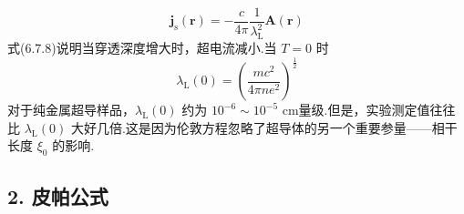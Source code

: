 \begin{equation}
  \boldsymbol{j}_{\mathrm{s}}(\boldsymbol{r})
  =-\frac{c}{4\pi}\frac{1}{\lambda_{\mathrm{L}}^{2}}\boldsymbol{A}(\boldsymbol{r})
\end{equation}
式(6.7.8)说明当穿透深度增大时，超电流减小.当 $T=0$ 时
\begin{equation}
  \lambda_{\mathrm{L}}(0)=\left(\frac{mc^{2}}{4\pi ne^{2}}\right)^{\frac{1}{2}}
\end{equation}
对于纯金属超导样品，$\lambda_{\mathrm{L}}(0)$ 约为 $10^{-6}\sim10^{-5}$ cm量级.但是，实验测定值往往比 $\lambda_{\mathrm{L}}(0)$ 大好几倍.这是因为伦敦方程忽略了超导体的另一个重要参量——相干长度 $\xi_{0}$ 的影响.

\subsection*{2. 皮帕公式}

